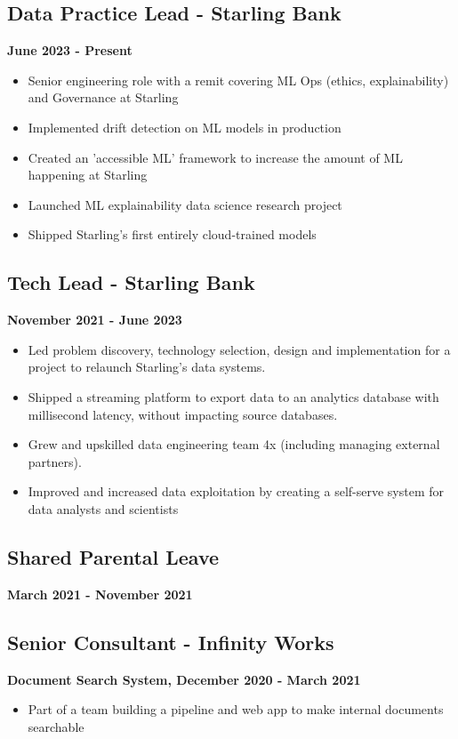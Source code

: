 \documentclass[a4paper]{scrartcl}
\begin{document}
\subsection*{Data Practice Lead - Starling Bank}
\textbf{June 2023 - Present}
\begin{itemize}
      \item Senior engineering role with a remit covering ML Ops
            (ethics,
            explainability) and Governance at Starling
      \item Implemented drift detection on ML models in production
      \item Created an 'accessible ML' framework to increase the amount of ML
            happening at Starling
      \item Launched ML explainability data science research project
      \item Shipped Starling's first entirely cloud-trained models
\end{itemize}

\subsection*{Tech Lead - Starling Bank}
\textbf{November 2021 - June 2023}
\begin{itemize}
      \item Led problem discovery, technology selection, design and
            implementation for a project to relaunch Starling's data systems.
      \item Shipped a streaming platform to export data to an analytics
            database
            with millisecond latency, without impacting source databases.
      \item Grew and upskilled data engineering team 4x (including managing
            external partners).
      \item Improved and increased data exploitation by creating a self-serve
            system for data analysts and scientists
\end{itemize}

\subsection*{Shared Parental Leave}
\textbf{March 2021 - November 2021}

\subsection*{Senior Consultant - Infinity Works}
\textbf{Document Search System, December 2020 - March 2021}
\begin{itemize}
      \item Part of a team building a pipeline and web app to make internal
            documents searchable
\end{itemize}
\end{document}
